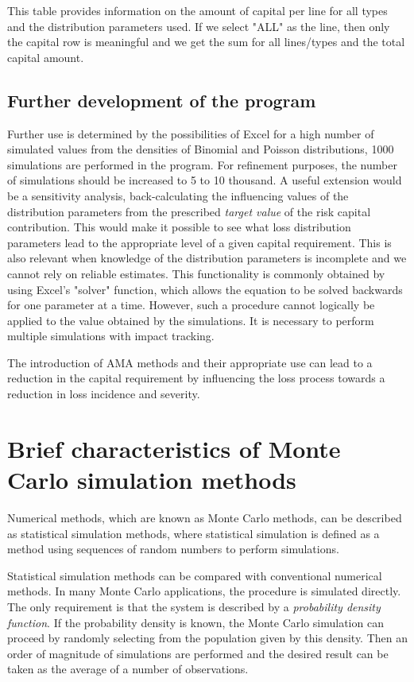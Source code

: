 \documentclass{article}
\begin{document}
This table provides information on the amount of capital per line for all types and the distribution parameters used. If we select "ALL" as the line, then only the capital row is meaningful and we get the sum for all lines/types and the total capital amount.


\subsection{Further development of the program}

Further use is determined by the possibilities of Excel for a high number of simulated values from the densities of Binomial and Poisson distributions, 1000 simulations are performed in the program. For refinement purposes, the number of simulations should be increased to 5 to 10 thousand. A useful extension would be a sensitivity analysis, back-calculating the influencing values of the distribution parameters from the prescribed \emph{target value} of the risk capital contribution. This would make it possible to see what loss distribution parameters lead to the appropriate level of a given capital requirement. This is also relevant when knowledge of the distribution parameters is incomplete and we cannot rely on reliable estimates. This functionality is commonly obtained by using Excel's "solver" function, which allows the equation to be solved backwards for one parameter at a time. However, such a procedure cannot logically be applied to the value obtained by the simulations. It is necessary to perform multiple simulations with impact tracking.

The introduction of AMA methods and their appropriate use can lead to a reduction in the capital requirement by influencing the loss process towards a reduction in loss incidence and severity.

\section{Brief characteristics of Monte Carlo simulation methods}

Numerical methods, which are known as Monte Carlo methods, can be described as statistical simulation methods, where statistical simulation is defined as a method using sequences of random numbers to perform simulations.

Statistical simulation methods can be compared with conventional numerical methods. In many Monte Carlo applications, the procedure is simulated directly. The only requirement is that the system is described by a \emph{probability density function}. If the probability density is known, the Monte Carlo simulation can proceed by randomly selecting from the population given by this density. Then an order of magnitude of simulations are performed and the desired result can be taken as the average of a number of observations.
\end{document}
